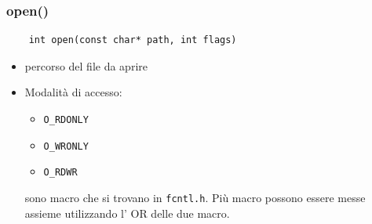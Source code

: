 \subsubsection{open()}
\begin{verbatim}
    int open(const char* path, int flags)
\end{verbatim}
\begin{itemize}
    \item percorso del file da aprire
    \item Modalità di accesso:
    \begin{itemize}
        \item \verb{O_RDONLY{
        \item \verb{O_WRONLY{
        \item \verb{O_RDWR{
    \end{itemize}
    sono macro che si trovano in \verb{fcntl.h{.
    Più macro possono essere messe assieme utilizzando l' OR delle due macro.
\end{itemize}
